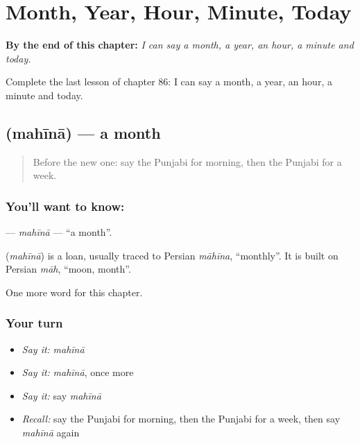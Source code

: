 
\chapter{Month, Year, Hour, Minute, Today}
\label{ch:pa-month-year-hour-minute-today}

\begin{chapteropening}
\textbf{By the end of this chapter:} \emph{I can say a month, a year, an hour, a minute and today.}

Complete the last lesson of chapter 86: I can say a month, a year, an hour, a minute and today.
\end{chapteropening}

\section[\texorpdfstring{\pa{ਮਹੀਨਾ} (mahīnā)}{ਮਹੀਨਾ (mahīnā)}]{ (mahīnā) — a month}

\label{lesson:PA-C86-mahina}



\begin{quote}
Before the new one: say the Punjabi for morning, then the Punjabi for a week.
\end{quote}

\subsection*{You'll want to know: }
\textbf{} — \emph{mahīnā} — \textquotedblleft{}a month\textquotedblright{}.

\begin{cousinweb}
\textbf{} (\emph{mahīnā}) is a loan, usually traced to Persian \emph{māhīna}, \textquotedblleft{}monthly\textquotedblright{}. It is built on Persian \emph{māh}, \textquotedblleft{}moon, month\textquotedblright{}.
\end{cousinweb}

\begin{grammarlens}[title={What you've built}]
One more word for this chapter.
\end{grammarlens}

\subsection*{Your turn}
\begin{itemize}
\raggedright
  \item \emph{Say it:} \emph{mahīnā}
  \item \emph{Say it:} \emph{mahīnā}, once more
  \item \emph{Say it:} say \emph{mahīnā}
  \item \emph{Recall:} say the Punjabi for morning, then the Punjabi for a week, then say \emph{mahīnā} again
\end{itemize}

